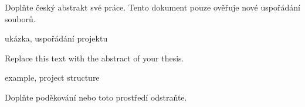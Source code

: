 \documentclass[FM,BP]{tulthesis}
\begin{document}


\begin{abstractCZ}
  Doplňte český abstrakt své práce. Tento dokument pouze ověřuje nové uspořádání souborů.
\end{abstractCZ}

\begin{keywordsCZ}
  ukázka, uspořádání projektu
\end{keywordsCZ}


\begin{abstractEN}
  Replace this text with the abstract of your thesis.
\end{abstractEN}

\begin{keywordsEN}
  example, project structure
\end{keywordsEN}



\begin{acknowledgement}
  Doplňte poděkování nebo toto prostředí odstraňte.
\end{acknowledgement}


\tableofcontents



\end{document}
